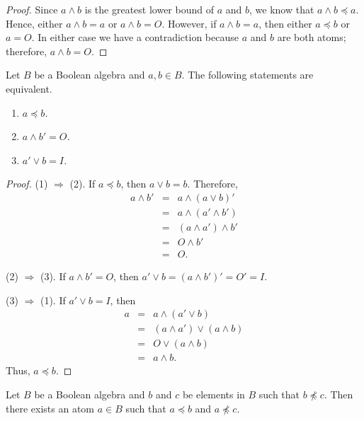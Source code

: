  
\begin{proof}
Since $a \wedge b$ is the greatest lower bound of $a$ and $b$, we know
that $a \wedge b \preceq a$.  Hence, either $a \wedge b = a$ or $a
\wedge b = O$. However, if $a \wedge b = a$, then either $a \preceq b$
or $a = O$.  In either case we have a contradiction because $a$ and
$b$ are both atoms; therefore, $a \wedge b = O$. 
\end{proof}
 
 
\begin{lemma}
Let $B$ be a Boolean algebra and $a, b \in B$. The following 
statements are equivalent. 
\begin{enumerate}
 
\rm \item \it
$a \preceq b$.
 
\rm \item \it
$a \wedge b' = O$.
 
\rm \item \it
$a' \vee b = I$.
 
\end{enumerate}
\end{lemma}
 
 
\begin{proof}
(1) $\Rightarrow$ (2).
If $a \preceq b$, then $a \vee b = b$. Therefore,
\begin{eqnarray*} 
a \wedge b' & = & a \wedge (a \vee b)' \\
& = & a \wedge ( a' \wedge b') \\
& = & ( a \wedge a') \wedge b' \\     
& = & O \wedge b' \\
& = & O.
\end{eqnarray*}
 
 
(2) $\Rightarrow$ (3).
If $a \wedge b' = O$, then $a' \vee b = (a \wedge b')' = O' = I$. 
 
 
(3) $\Rightarrow$ (1). 
If $a' \vee b = I$, then
\begin{eqnarray*}
a & = &  a \wedge (a' \vee b)  \\
& = &  (a \wedge a') \vee (a  \wedge  b) \\
& = & O \vee (a  \wedge  b) \\
& = & a \wedge b.
\end{eqnarray*}
Thus, $a \preceq b$.
\end{proof}
 
 
\begin{lemma}
Let $B$ be a Boolean algebra and $b$ and $c$ be elements in $B$ such
that $b \not\preceq c$. Then there exists an atom $a \in B$ such that
$a \preceq b$ and $a \not\preceq c$.
\end{lemma}
 
